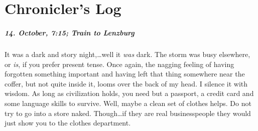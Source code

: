 \chapter{Chronicler's Log}

\paragraph{14. October, 7:15; Train to Lenzburg}
It was a dark and story night,\ldots well it \emph{was} dark.
The storm was busy elsewhere, or \emph{is}, if you prefer present tense.
Once again, the nagging feeling of having forgotten something important and having left that thing somewhere near the coffer, but not quite inside it, looms over the back of my head.
I silence it with wisdom.
As long as civilization holds, you need but a passport, a credit card and some language skills to survive.
Well, maybe a clean set of clothes helps.
Do not try to go into a store naked.
Though\ldots if they are real businesspeople they would just show you to the clothes department.